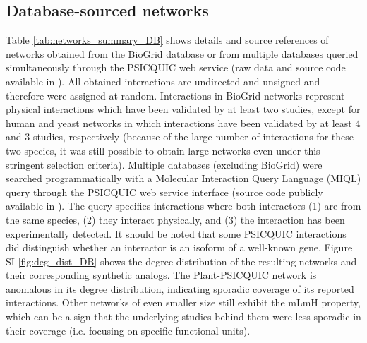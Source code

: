 

\newpage
\subsection{Database-sourced networks}\label{sup_realnets_DB}
Table \ref{tab:networks_summary_DB} shows details and source references of networks obtained from the  BioGrid database or from multiple databases queried simultaneously through the PSICQUIC web service (raw data and source code available in  \cite{atiia_case-study_2017}).
All obtained interactions are undirected and unsigned and therefore were assigned at random. Interactions in BioGrid networks represent physical interactions which have been validated by at least two studies, except for human and yeast networks in which interactions have been validated by at least 4 and 3 studies, respectively (because of the large number of interactions for these two species, it was still possible to obtain large networks even under this stringent selection criteria). Multiple databases  (excluding BioGrid) were searched programmatically with a Molecular Interaction Query Language (MIQL) query through the  PSICQUIC web service interface (source code publicly available in  \cite{atiia_case-study_2017}).
The query specifies interactions where both interactors (1) are from the same species,  (2) they interact physically, and (3) the interaction has been experimentally detected.
It should be noted that some PSICQUIC interactions did distinguish whether an interactor is an isoform of a well-known gene. Figure SI \ref{fig:deg_dist_DB} shows the degree distribution of the resulting networks and their corresponding synthetic analogs. The Plant-PSICQUIC network is anomalous in its degree distribution, indicating sporadic coverage of its reported interactions. Other networks of even smaller size still exhibit the mLmH property, which can be a sign that the underlying studies behind them were less sporadic in their coverage (i.e. focusing on specific functional units).


\newpage

